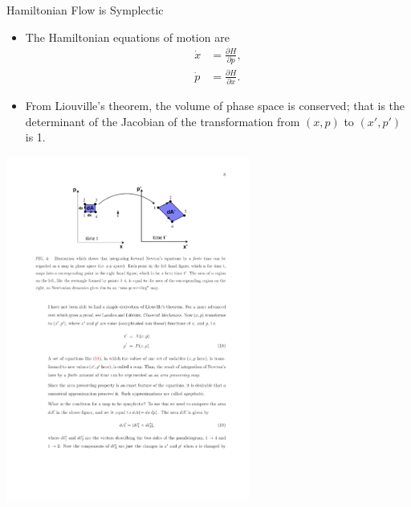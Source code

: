 \documentclass{beamer}
\begin{document}
 \begin{frame}{Hamiltonian Flow is Symplectic}
  \begin{itemize}
    \item The Hamiltonian equations of motion are
    \begin{align*}
      \dot{x} &=\frac{\partial H}{\partial p}, \\
      \dot{p} &=\frac{\partial H}{\partial x}.
    \end{align*}
    \item From Liouville's theorem, the volume of phase space is conserved; that is the determinant of the Jacobian of the transformation from $(x,p)$ to $(x',p')$ is 1.
  \end{itemize}
  \centerline{\includegraphics[width=0.6\textwidth]{./symplectic.pdf}}

 \end{frame}
\end{document}
